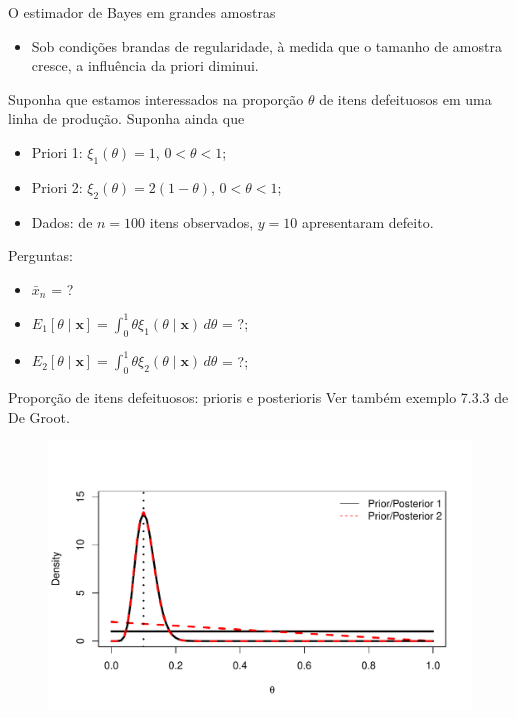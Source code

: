 \begin{frame}{O estimador de Bayes em grandes amostras}
\begin{itemize}
 \item Sob condições brandas de regularidade, à medida que o tamanho de amostra cresce, a influência da priori diminui.
\end{itemize}

\begin{exemplo}
Suponha que estamos interessados na proporção $\theta$ de itens defeituosos em uma linha de produção.
Suponha ainda que
\begin{itemize}
 \item Priori 1: $\xi_1(\theta) = 1$, $0 < \theta < 1$;
 \item Priori 2: $\xi_2(\theta) = 2(1-\theta)$, $0 < \theta < 1$;
 \item Dados: de $n = 100$ itens observados, $y = 10$ apresentaram defeito.
\end{itemize}

Perguntas:
\begin{itemize}
 \item $\bar{x}_n$ = ?
 \item $E_1[\theta \mid \boldsymbol{x}] = \int_{0}^1 \theta \xi_1(\theta \mid \boldsymbol{x})\,d\theta$ = ?;
 \item $E_2[\theta \mid \boldsymbol{x}] = \int_{0}^1 \theta \xi_2(\theta \mid \boldsymbol{x})\,d\theta$ = ?;
\end{itemize} 
\end{exemplo}
\end{frame}

\begin{frame}{Proporção de itens defeituosos: prioris e posterioris}
Ver também exemplo 7.3.3 de De Groot.
\begin{figure}[!ht]
\label{fig:defect_items}
\begin{center}
\includegraphics[scale=0.65]{figures/defeituosos.pdf} 
\end{center} 
\end{figure} 
\end{frame}



